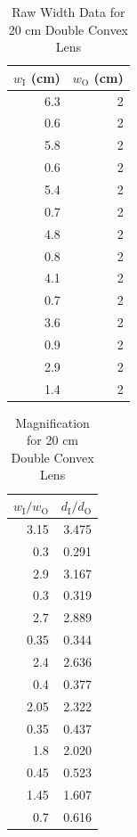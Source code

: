 \begin{table}[ht]
    \centering
    \begin{tabular}{|r|r|}
        \hline
        $w_{\text{I}}$ (cm) & $w_{\text{O}}$ (cm) \\
        \hline
        6.3 & 2 \\
        0.6 & 2 \\
        5.8 & 2 \\
        0.6 & 2 \\
        5.4 & 2 \\
        0.7 & 2 \\
        4.8 & 2 \\
        0.8 & 2 \\
        4.1 & 2 \\
        0.7 & 2 \\
        3.6 & 2 \\
        0.9 & 2 \\
        2.9 & 2 \\
        1.4 & 2 \\
        \hline
    \end{tabular}
    \caption{Raw Width Data for 20 cm Double Convex Lens}
    \label{table.08.width.20cm}
\end{table}
%
\begin{table}[ht]
    \centering
    \begin{tabular}{|r|r|}
        \hline
        $w_{\text{I}} / w_{\text{O}}$ & $d_{\text{I}} / d_{\text{O}}$ \\
        \hline
        3.15 & 3.475 \\
        0.3 & 0.291 \\
        2.9 & 3.167 \\
        0.3 & 0.319 \\
        2.7 & 2.889 \\
        0.35 & 0.344 \\
        2.4 & 2.636 \\
        0.4 & 0.377 \\
        2.05 & 2.322 \\
        0.35 & 0.437 \\
        1.8 & 2.020 \\
        0.45 & 0.523 \\
        1.45 & 1.607 \\
        0.7 & 0.616 \\
        \hline
    \end{tabular}
    \caption{Magnification for 20 cm Double Convex Lens}
    \label{table.08.magnification.20cm}
\end{table}
